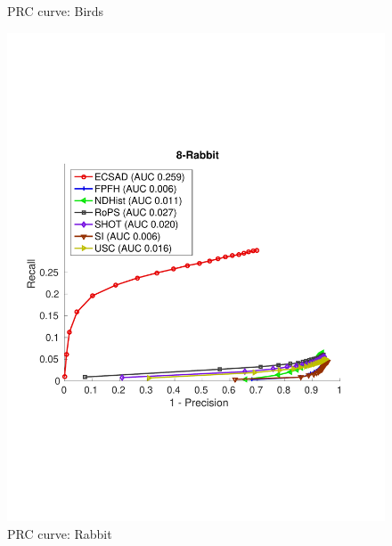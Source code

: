 \documentclass[10pt,twocolumn,letterpaper]{article}
\begin{document}
\begin{figure}[h]
\begin{minipage}[b]{.3\textwidth}
\caption{PRC curve: Birds }\label{fig:birds}
\end{minipage}
\begin{minipage}[b]{.3\textwidth}
\includegraphics[clip, trim=0.7cm 6cm 0.7cm 6cm,width=1.0\linewidth, height= 1.0\linewidth, keepaspectratio]{img/8-Rabbit_L2_RATIO_zoom.pdf}
\caption{PRC curve: Rabbit }\label{fig:rabbit}
\end{minipage}
\end{figure}
\end{document}
